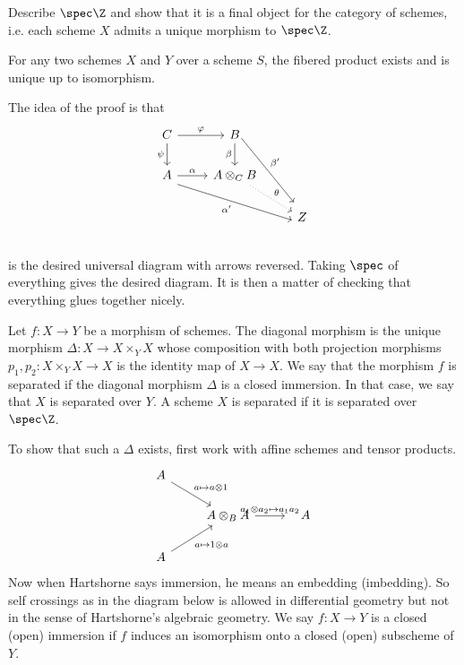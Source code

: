 \begin{exc}
Describe $\spec \Z$ and show that it is a final object for the category of schemes, i.e. each scheme $X$ admits a unique morphism to $\spec \Z$. 
\end{exc}


\begin{thmm}
For any two schemes $X$ and $Y$ over a scheme $S$, the fibered product exists and is unique up to isomorphism. 
\end{thmm}

\pf The idea of the proof is that 
	\[
	\begin{tikzcd}
	C \arrow{r}{\varphi} \arrow[swap]{d}{\psi} & B \arrow[swap]{d}{\beta} \arrow[yshift=1ex]{ddr}{\beta'} &  \\
	A \arrow{r}{\alpha} \arrow[swap,yshift=-1ex]{drr}{\alpha'} & A \otimes_C B \arrow[dotted]{dr}{\theta} &  \\
	 &  & Z \\
	\end{tikzcd}
	\]
is the desired universal diagram with arrows reversed. Taking $\spec$ of everything gives the desired diagram. It is then a matter of checking that everything glues together nicely. 


\begin{dfn}
Let $f: X \to Y$ be a morphism of schemes. The diagonal morphism is the unique morphism $\Delta: X \to X \times_Y X$ whose composition with both projection morphisms $p_1,p_2: X \times_Y X \to X$ is the identity map of $X \to X$. We say that the morphism $f$ is separated if the diagonal morphism $\Delta$ is a closed immersion. In that case, we say that $X$ is separated over $Y$. A scheme $X$ is separated if it is separated over $\spec \Z$. 
\end{dfn}

To show that such a $\Delta$ exists, first work with affine schemes and tensor products. 
	\[
	\begin{tikzcd}
	A  \arrow{dr}{a \mapsto a \otimes 1} & & \\
	& A \otimes_B A \arrow{r}{a_1 \otimes a_2 \mapsto a_1a_2} & \;\;\;A \\
	A \arrow[swap]{ur}{a \mapsto 1 \otimes a} & & 
	\end{tikzcd}
	\]
Now when Hartshorne says immersion, he means an embedding (imbedding). So self crossings as in the diagram below is allowed in differential geometry but not in the sense of Hartshorne's algebraic geometry.  
We say $f: X \to Y$ is a closed (open) immersion if $f$ induces an isomorphism onto a closed (open) subscheme of $Y$. 

